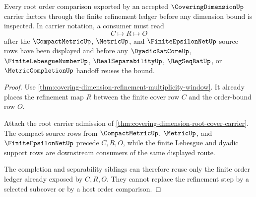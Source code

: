 \begin{theorem}
\label{thm:covering-dimension-root-refinement-obligation}
Every root order comparison exported by an accepted $\CoveringDimensionUp$ carrier factors through the finite refinement ledger before any dimension bound is inspected. In carrier notation, a consumer must read
$$
C \longmapsto R \longmapsto O
$$
after the $\CompactMetricUp$, $\MetricUp$, and $\FiniteEpsilonNetUp$ source rows have been displayed and before any $\DyadicRatCoreUp$, $\FiniteLebesgueNumberUp$, $\RealSeparabilityUp$, $\RegSeqRatUp$, or $\MetricCompletionUp$ handoff reuses the bound.
\end{theorem}
\begin{proof}
Use \autoref{thm:covering-dimension-refinement-multiplicity-window}. It already places the refinement map $R$ between the finite cover row $C$ and the order-bound row $O$.

Attach the root carrier admission of \autoref{thm:covering-dimension-root-cover-carrier}. The compact source rows from $\CompactMetricUp$, $\MetricUp$, and $\FiniteEpsilonNetUp$ precede $C,R,O$, while the finite Lebesgue and dyadic support rows are downstream consumers of the same displayed route.

The completion and separability siblings can therefore reuse only the finite order ledger already exposed by $C,R,O$. They cannot replace the refinement step by a selected subcover or by a host order comparison.
\end{proof}

